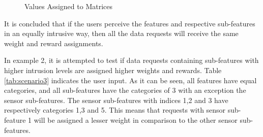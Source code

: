 \begin{figure}[htp]
  \hspace{1em}
  \caption{Values Assigned to Matrices}
  \label{fig:scenatio11}
\end{figure}

%

It is concluded that if the users perceive the features and respective sub-features in an equally intrusive way, then all the
data requests will receive the same weight and reward assignments.

In example 2, it is attempted to test if data requests containing sub-features with higher intrusion levels are assigned higher weights and rewards.
Table \ref{tab:scenario3} indicates the user input. As it can be seen, all features have equal categories, and
all sub-features have the categories of 3 with an exception the sensor sub-features. The sensor sub-features with indices 1,2 and 3 have respectively categories 1,3 and 5. This means that requests with sensor sub-feature 1 will be assigned a lesser weight in comparison to the other sensor sub-features. 

